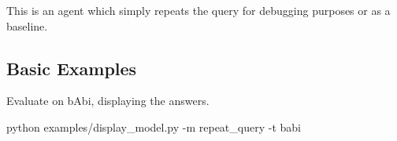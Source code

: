 This is an agent which simply repeats the query for debugging purposes or as a baseline.

\subsection*{Basic Examples}

Evaluate on b\+Abi, displaying the answers. 
\begin{DoxyCode}
python examples/display\_model.py -m repeat\_query -t babi
\end{DoxyCode}
 